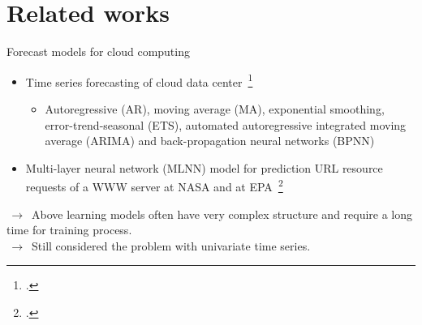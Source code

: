 \documentclass{beamer}
\begin{document}
\section{Related works}
\begin{frame}{Forecast models for cloud computing}
	\begin{itemize}
			\item{
				Time series forecasting of cloud data center~\footcite{Hipel et al. 1994}
				}
				\begin{itemize}
					\item {
						Autoregressive (AR), moving average (MA), exponential smoothing, error-trend-seasonal (ETS), automated autoregressive integrated moving average (ARIMA) and back-propagation neural networks (BPNN)  
					}
				\end{itemize}	

			\item {
	 			Multi-layer neural network (MLNN) model for prediction URL resource requests of a WWW server at NASA and at EPA~\footcite{Prevost et al. 2011}  
			}
	\end{itemize}
	\vspace{0.3cm}
		$\,\to\,$ Above learning models often have very complex structure and require a long time for training process.\\
		$\,\to\,$ Still considered the problem with univariate time series.

\end{frame}
\end{document}
